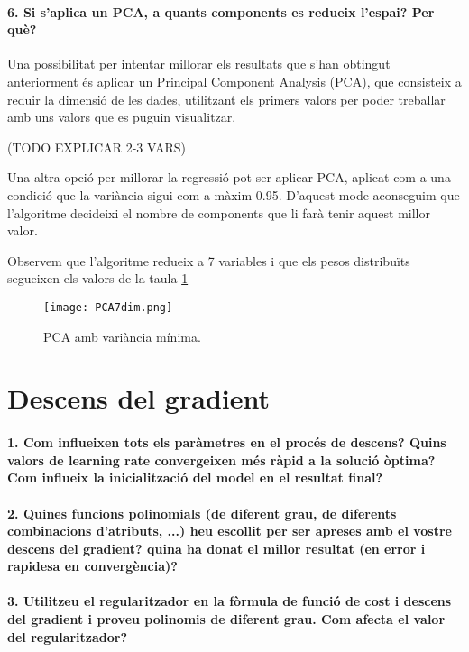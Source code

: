 \documentclass[a4paper, 11pt]{article}
\begin{document}
    \paragraph{6. Si s'aplica un PCA, a quants components es redueix l'espai? Per què?}
    Una possibilitat per intentar millorar els resultats que s'han obtingut anteriorment és aplicar
    un Principal Component Analysis (PCA), que consisteix a reduir la dimensió de les dades,
    utilitzant els primers valors per poder treballar amb uns valors que es puguin visualitzar.

    (TODO EXPLICAR 2-3 VARS)

    Una altra opció per millorar la regressió pot ser aplicar PCA, aplicat com a una condició que
    la variància sigui com a màxim 0.95. D'aquest mode aconseguim que l'algoritme decideixi el
    nombre de components que li farà tenir aquest millor valor.

    Observem que l'algoritme redueix a 7 variables i que els pesos distribuïts segueixen els valors
    de la taula \ref{fig:PCA_7}

    \begin{figure}[H]
        \centering
        \texttt{[image: PCA7dim.png]}
        \caption{PCA amb variància mínima.}
        \label{fig:PCA_7}
    \end{figure}




    \newpage
    \section{Descens del gradient}

    \paragraph{1. Com influeixen tots els paràmetres en el procés de descens? Quins valors de
    learning rate convergeixen més ràpid a la solució òptima? Com influeix la inicialització
    del model en el resultat final?}


    \paragraph{2. Quines funcions polinomials (de diferent grau, de diferents combinacions
    d'atributs, ...) heu escollit per ser apreses amb el vostre descens del gradient? quina ha
    donat el millor resultat (en error i rapidesa en convergència)?}

    \paragraph{3. Utilitzeu el regularitzador en la fòrmula de funció de cost i descens del
    gradient i proveu polinomis de diferent grau. Com afecta el valor del regularitzador?}
\end{document}
